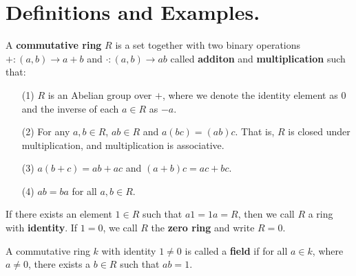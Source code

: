 
\section{Definitions and Examples.}
\label{section1}

\begin{definition}
    A \textbf{commutative ring} $R$ is a set together with two binary operations
    $+:(a,b) \xrightarrow{} a+b$ and $\cdot:(a,b) \xrightarrow{} ab$ called
    \textbf{additon} and \textbf{multiplication} such that:
    \begin{enumerate}
        \item[(1)] $R$ is an Abelian group over $+$, where we denote the
            identity element as $0$ and the inverse of each $a \in R$ as $-a$.

        \item[(2)] For any $a,b \in R$,  $ab \in R$ and $a(bc)=(ab)c$. That is,
            $R$ is closed under multiplication, and  multiplication is
            associative.

        \item[(3)] $a(b+c)=ab+ac$ and $(a+b)c=ac+bc$.

        \item[(4)] $ab=ba$ for all  $a,b \in R$.
    \end{enumerate}
     If there exists an element $1 \in R$ such that  $a1=1a=R$, then we call
     $R$ a ring with \textbf{identity}. If $1=0$, we call  $R$ the  \textbf{zero
     ring} and write $R=0$.
\end{definition}

\begin{definition}
    A commutative ring $k$ with identity $1 \neq 0$ is called a
    \textbf{field} if for all $a \in k$, where  $a \neq 0$, there exists
    a $b \in R$ such that $ab=1$.
\end{definition}


